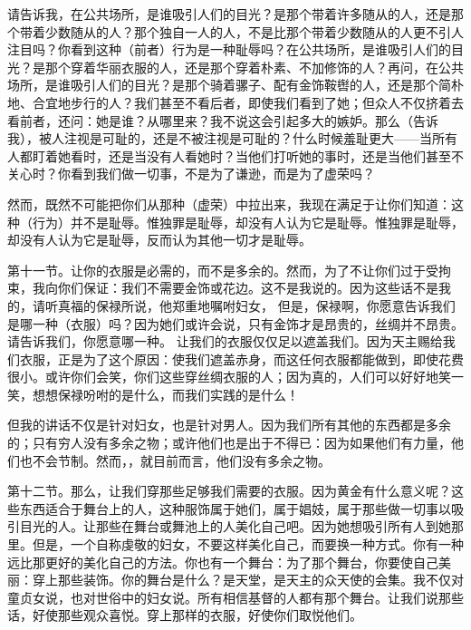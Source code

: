 请告诉我，在公共场所，是谁吸引人们的目光？是那个带着许多随从的人，还是那个带着少数随从的人？那个独自一人的人，不是比那个带着少数随从的人更不引人注目吗？你看到这种（前者）行为是一种耻辱吗？在公共场所，是谁吸引人们的目光？是那个穿着华丽衣服的人，还是那个穿着朴素、不加修饰的人？再问，在公共场所，是谁吸引人们的目光？是那个骑着骡子、配有金饰鞍辔的人，还是那个简朴地、合宜地步行的人？我们甚至不看后者，即使我们看到了她；但众人不仅挤着去看前者，还问：她是谁？从哪里来？我不说这会引起多大的嫉妒。那么（告诉我），被人注视是可耻的，还是不被注视是可耻的？什么时候羞耻更大——当所有人都盯着她看时，还是当没有人看她时？当他们打听她的事时，还是当他们甚至不关心时？你看到我们做一切事，不是为了谦逊，而是为了虚荣吗？\par

然而，既然不可能把你们从那种（虚荣）中拉出来，我现在满足于让你们知道：这种（行为）并不是耻辱。惟独罪是耻辱，却没有人认为它是耻辱。惟独罪是耻辱，却没有人认为它是耻辱，反而认为其他一切才是耻辱。\par

第十一节。让你的衣服是必需的，而不是多余的。然而，为了不让你们过于受拘束，我向你们保证：我们不需要金饰或花边。这不是我说的。因为这些话不是我的，请听真福的保禄所说，他郑重地嘱咐妇女， 但是，保禄啊，你愿意告诉我们是哪一种（衣服）吗？因为她们或许会说，只有金饰才是昂贵的，丝绸并不昂贵。请告诉我们，你愿意哪一种。 让我们的衣服仅仅足以遮盖我们。因为天主赐给我们衣服，正是为了这个原因：使我们遮盖赤身，而这任何衣服都能做到，即使花费很小。或许你们会笑，你们这些穿丝绸衣服的人；因为真的，人们可以好好地笑一笑，想想保禄吩咐的是什么，而我们实践的是什么！\par

但我的讲话不仅是针对妇女，也是针对男人。因为我们所有其他的东西都是多余的；只有穷人没有多余之物；或许他们也是出于不得已：因为如果他们有力量，他们也不会节制。然而，，就目前而言，他们没有多余之物。\par

第十二节。那么，让我们穿那些足够我们需要的衣服。因为黄金有什么意义呢？这些东西适合于舞台上的人，这种服饰属于她们，属于娼妓，属于那些做一切事以吸引目光的人。让那些在舞台或舞池上的人美化自己吧。因为她想吸引所有人到她那里。但是，一个自称虔敬的妇女，不要这样美化自己，而要换一种方式。你有一种远比那更好的美化自己的方法。你也有一个舞台：为了那个舞台，你要使自己美丽：穿上那些装饰。你的舞台是什么？是天堂，是天主的众天使的会集。我不仅对童贞女说，也对世俗中的妇女说。所有相信基督的人都有那个舞台。让我们说那些话，好使那些观众喜悦。穿上那样的衣服，好使你们取悦他们。\par

